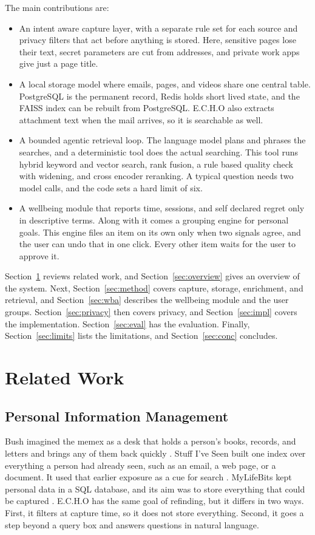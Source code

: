\documentclass[conference]{IEEEtran}
\begin{document}
The main contributions are:
\begin{itemize}
\item An intent aware capture layer, with a separate rule set for each source and privacy filters that act before anything is stored. Here, sensitive pages lose their text, secret parameters are cut from addresses, and private work apps give just a page title.
\item A local storage model where emails, pages, and videos share one central table. PostgreSQL is the permanent record, Redis holds short lived state, and the FAISS index can be rebuilt from PostgreSQL. E.C.H.O also extracts attachment text when the mail arrives, so it is searchable as well.
\item A bounded agentic retrieval loop. The language model plans and phrases the searches, and a deterministic tool does the actual searching. This tool runs hybrid keyword and vector search, rank fusion, a rule based quality check with widening, and cross encoder reranking. A typical question needs two model calls, and the code sets a hard limit of six.
\item A wellbeing module that reports time, sessions, and self declared regret only in descriptive terms. Along with it comes a grouping engine for personal goals. This engine files an item on its own only when two signals agree, and the user can undo that in one click. Every other item waits for the user to approve it.
\end{itemize}

Section~\ref{sec:related} reviews related work, and Section~\ref{sec:overview} gives an overview of the system. Next, Section~\ref{sec:method} covers capture, storage, enrichment, and retrieval, and Section~\ref{sec:wba} describes the wellbeing module and the user groups. Section~\ref{sec:privacy} then covers privacy, and Section~\ref{sec:impl} covers the implementation. Section~\ref{sec:eval} has the evaluation. Finally, Section~\ref{sec:limits} lists the limitations, and Section~\ref{sec:conc} concludes.

\section{Related Work}\label{sec:related}
\subsection{Personal Information Management}
Bush imagined the memex as a desk that holds a person's books, records, and letters and brings any of them back quickly \cite{b1}. Stuff I've Seen built one index over everything a person had already seen, such as an email, a web page, or a document. It used that earlier exposure as a cue for search \cite{b2}. MyLifeBits kept personal data in a SQL database, and its aim was to store everything that could be captured \cite{b3}. E.C.H.O has the same goal of refinding, but it differs in two ways. First, it filters at capture time, so it does not store everything. Second, it goes a step beyond a query box and answers questions in natural language.
\end{document}
